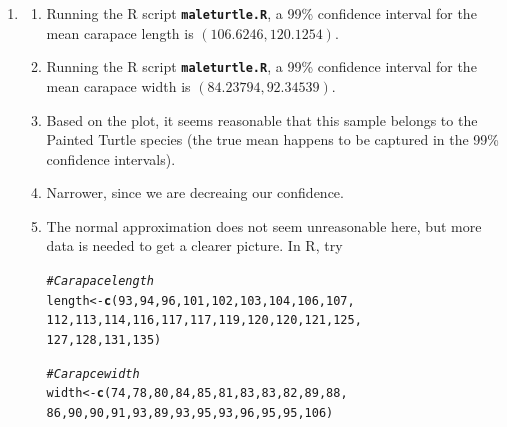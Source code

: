 \documentclass{article}\usepackage[]{graphicx}\usepackage[]{color}
\makeatletter
\newcommand{\hlnum}[1]{\textcolor[rgb]{0.686,0.059,0.569}{#1}}%
\newcommand{\hlcom}[1]{\textcolor[rgb]{0.678,0.584,0.686}{\textit{#1}}}%
\newcommand{\hlstd}[1]{\textcolor[rgb]{0.345,0.345,0.345}{#1}}%
\newcommand{\hlkwb}[1]{\textcolor[rgb]{0.69,0.353,0.396}{#1}}%
\newcommand{\hlkwd}[1]{\textcolor[rgb]{0.737,0.353,0.396}{\textbf{#1}}}%
\newenvironment{kframe}{%
 \def\at@end@of@kframe{}%
 \ifinner\ifhmode%
  \def\at@end@of@kframe{\end{minipage}}%
  \begin{minipage}{\columnwidth}%
 \fi\fi%
 \def\FrameCommand##1{\hskip\@totalleftmargin \hskip-\fboxsep
 \colorbox{shadecolor}{##1}\hskip-\fboxsep
     \hskip-\linewidth \hskip-\@totalleftmargin \hskip\columnwidth}%
 \MakeFramed {\advance\hsize-\width
   \@totalleftmargin\z@ \linewidth\hsize
   \@setminipage}}%
 {\par\unskip\endMakeFramed%
 \at@end@of@kframe}
\newenvironment{knitrout}{}{} %
\makeatother
\begin{document}
\begin{enumerate}
  \item \begin{enumerate}
          \item Running the R script \texttt{\textbf{maleturtle.R}}, a 99\% confidence interval for the mean carapace length is $\left(106.6246, 120.1254\right)$.
          \item Running the R script \texttt{\textbf{maleturtle.R}}, a 99\% confidence interval for the mean carapace width is $\left(84.23794, 92.34539\right)$.
          \item Based on the plot, it seems reasonable that this sample belongs to the Painted Turtle species (the true mean happens to be captured in the 99\% confidence intervals).
          \item Narrower, since we are decreaing our confidence.
          \item The normal approximation does not seem unreasonable here, but more data is needed to get a clearer picture. In R, try
\begin{knitrout}
\color{fgcolor}\begin{kframe}
\begin{alltt}
\hlcom{# Carapace length}
\hlstd{length} \hlkwb{<-} \hlkwd{c}\hlstd{(}\hlnum{93}\hlstd{,} \hlnum{94}\hlstd{,} \hlnum{96}\hlstd{,} \hlnum{101}\hlstd{,} \hlnum{102}\hlstd{,} \hlnum{103}\hlstd{,} \hlnum{104}\hlstd{,} \hlnum{106}\hlstd{,} \hlnum{107}\hlstd{,}
  \hlnum{112}\hlstd{,} \hlnum{113}\hlstd{,} \hlnum{114}\hlstd{,} \hlnum{116}\hlstd{,} \hlnum{117}\hlstd{,} \hlnum{117}\hlstd{,} \hlnum{119}\hlstd{,} \hlnum{120}\hlstd{,} \hlnum{120}\hlstd{,} \hlnum{121}\hlstd{,} \hlnum{125}\hlstd{,}
  \hlnum{127}\hlstd{,} \hlnum{128}\hlstd{,} \hlnum{131}\hlstd{,} \hlnum{135}\hlstd{)}

\hlcom{# Carapce width}
\hlstd{width} \hlkwb{<-} \hlkwd{c}\hlstd{(}\hlnum{74}\hlstd{,} \hlnum{78}\hlstd{,} \hlnum{80}\hlstd{,} \hlnum{84}\hlstd{,} \hlnum{85}\hlstd{,} \hlnum{81}\hlstd{,} \hlnum{83}\hlstd{,} \hlnum{83}\hlstd{,} \hlnum{82}\hlstd{,} \hlnum{89}\hlstd{,} \hlnum{88}\hlstd{,}
  \hlnum{86}\hlstd{,} \hlnum{90}\hlstd{,} \hlnum{90}\hlstd{,} \hlnum{91}\hlstd{,} \hlnum{93}\hlstd{,} \hlnum{89}\hlstd{,} \hlnum{93}\hlstd{,} \hlnum{95}\hlstd{,} \hlnum{93}\hlstd{,} \hlnum{96}\hlstd{,} \hlnum{95}\hlstd{,} \hlnum{95}\hlstd{,} \hlnum{106}\hlstd{)}


\end{alltt}
\end{kframe}
\end{knitrout}
\end{enumerate}
\end{enumerate}
\end{document}
